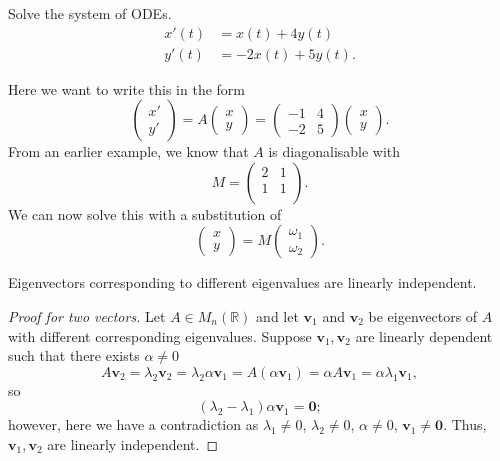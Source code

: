 \begin{example}
    Solve the system of ODEs.
    \begin{align*}
        x'(t) &= x(t) + 4y(t) \\
        y'(t) &= -2x(t) + 5y(t).
    \end{align*}
    
    Here we want to write this in the form 
    \[
        \begin{pmatrix}
            x' \\ y'
        \end{pmatrix}
        = A
        \begin{pmatrix}
            x \\ y
        \end{pmatrix}
        =
        \begin{pmatrix}
            -1 & 4 \\ -2 & 5
        \end{pmatrix}
        \begin{pmatrix}
            x \\ y
        \end{pmatrix}
        .
    \]
    From an earlier example, we know that $A$ is diagonalisable with 
    \[
        M =
        \begin{pmatrix}
           2 & 1 \\
           1 & 1 \\
        \end{pmatrix}
        .
    \]
    We can now solve this with a substitution of
    \[
        \begin{pmatrix}
            x \\ y
        \end{pmatrix}
        =
        M
        \begin{pmatrix}
            \omega_1 \\ \omega_2
        \end{pmatrix}
        .
    \]
\end{example}

\begin{proposition}
    Eigenvectors corresponding to different eigenvalues are linearly independent.
\end{proposition}

\begin{proof}[Proof for two vectors]
    Let $A \in M_n(\mathbb{R})$ and let $\bm{v}_1$ and $\bm{v}_2$ be eigenvectors of $A$ with different corresponding eigenvalues. Suppose $\bm{v}_1, \bm{v}_2$ are linearly dependent such that there exists $\alpha \neq 0$ \[ A \bm{v}_2 = \lambda_2 \bm{v}_2 = \lambda_2 \alpha \bm{v}_1 = A(\alpha \bm{v}_1) = \alpha A \bm{v}_1 = \alpha \lambda_1 \bm{v}_1, \] so \[ (\lambda_2 - \lambda_1) \alpha \bm{v}_1 = \bm{0}; \] however, here we have a contradiction as $\lambda_1 \neq 0$, $\lambda_2 \neq 0$, $\alpha \neq 0$, $\bm{v}_1 \neq \bm{0}$. Thus, $\bm{v}_1, \bm{v}_2$ are linearly independent.
\end{proof}

